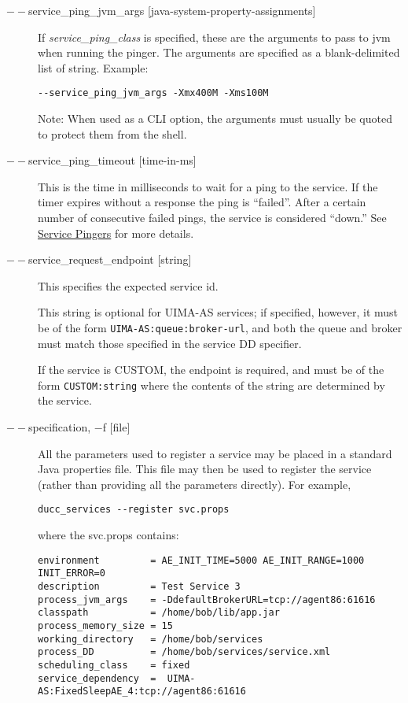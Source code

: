 \begin{description}
      \item[$--$service\_ping\_jvm\_args {[java-system-property-assignments]}] If 
        {\em service\_ping\_class} is specified, these are the arguments 
        to pass to jvm when running the pinger. The arguments are specified as a blank-delimited
        list of string.  Example:
\begin{verbatim}
--service_ping_jvm_args -Xmx400M -Xms100M
\end{verbatim}
        
        Note: When used as a CLI option, the arguments must usually be
        quoted to protect them from the shell.

      \item[$--$service\_ping\_timeout {[time-in-ms]}] This is the time in milliseconds to wait for a
        ping to the service.  If the timer expires without a response the ping is ``failed''. After
        a certain number of consecutive failed pings, the service is considered ``down.''  See
        \hyperref[sec:service.pingers]{Service Pingers} for more details.

      \item[$--$service\_request\_endpoint {[string]}] This specifies the expected service id.  

        This string is optional for UIMA-AS services; if specified, however, it must be of the
        form {\tt UIMA-AS:queue:broker-url}, and both the queue and broker must match those specified in the
        service DD specifier.

        If the service is CUSTOM, the endpoint is required, and must be of the form
        {\tt CUSTOM:string} where the contents of the string are determined by the service.

      \item[$--$specification, $-$f {[file]}] All the parameters used to register a service may be placed in a
        standard Java properties file.  This file may then be used to register the service (rather than
        providing all the parameters directly).
        For example, 

\begin{verbatim}
ducc_services --register svc.props 
\end{verbatim}
        
        where the svc.props contains: 

\begin{verbatim}
environment         = AE_INIT_TIME=5000 AE_INIT_RANGE=1000 INIT_ERROR=0
description         = Test Service 3
process_jvm_args    = -DdefaultBrokerURL=tcp://agent86:61616
classpath           = /home/bob/lib/app.jar
process_memory_size = 15
working_directory   = /home/bob/services
process_DD          = /home/bob/services/service.xml
scheduling_class    = fixed
service_dependency  =  UIMA-AS:FixedSleepAE_4:tcp://agent86:61616
\end{verbatim}
        

\end{description}

